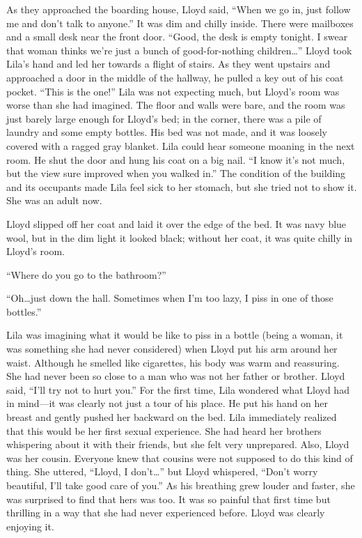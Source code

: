 \documentclass[
  letterpaper,
]{book}
\begin{document}
As they approached the boarding house, Lloyd said, ``When we go in, just
follow me and don't talk to anyone.'' It was dim and chilly inside.
There were mailboxes and a small desk near the front door. ``Good, the
desk is empty tonight. I swear that woman thinks we're just a bunch of
good-for-nothing children\ldots{}'' Lloyd took Lila's hand and led her
towards a flight of stairs. As they went upstairs and approached a door
in the middle of the hallway, he pulled a key out of his coat pocket.
``This is the one!'' Lila was not expecting much, but Lloyd's room was
worse than she had imagined. The floor and walls were bare, and the room
was just barely large enough for Lloyd's bed; in the corner, there was a
pile of laundry and some empty bottles. His bed was not made, and it was
loosely covered with a ragged gray blanket. Lila could hear someone
moaning in the next room. He shut the door and hung his coat on a big
nail. ``I know it's not much, but the view sure improved when you walked
in.'' The condition of the building and its occupants made Lila feel
sick to her stomach, but she tried not to show it. She was an adult now.

Lloyd slipped off her coat and laid it over the edge of the bed. It was
navy blue wool, but in the dim light it looked black; without her coat,
it was quite chilly in Lloyd's room.

``Where do you go to the bathroom?''

``Oh\ldots just down the hall. Sometimes when I'm too lazy, I piss in
one of those bottles.''

Lila was imagining what it would be like to piss in a bottle (being a
woman, it was something she had never considered) when Lloyd put his arm
around her waist. Although he smelled like cigarettes, his body was warm
and reassuring. She had never been so close to a man who was not her
father or brother. Lloyd said, ``I'll try not to hurt you.'' For the
first time, Lila wondered what Lloyd had in mind---it was clearly not
just a tour of his place. He put his hand on her breast and gently
pushed her backward on the bed. Lila immediately realized that this
would be her first sexual experience. She had heard her brothers
whispering about it with their friends, but she felt very unprepared.
Also, Lloyd was her cousin. Everyone knew that cousins were not supposed
to do this kind of thing. She uttered, ``Lloyd, I don't\ldots{}'' but
Lloyd whispered, ``Don't worry beautiful, I'll take good care of you.''
As his breathing grew louder and faster, she was surprised to find that
hers was too. It was so painful that first time but thrilling in a way
that she had never experienced before. Lloyd was clearly enjoying it.
\end{document}
